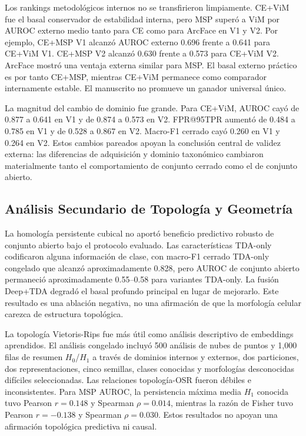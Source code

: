 \documentclass[11pt]{article}
\begin{document}
Los rankings metodológicos internos no se transfirieron limpiamente. CE+ViM fue el basal conservador de estabilidad interna, pero MSP superó a ViM por AUROC externo medio tanto para CE como para ArcFace en V1 y V2. Por ejemplo, CE+MSP V1 alcanzó AUROC externo 0.696 frente a 0.641 para CE+ViM V1. CE+MSP V2 alcanzó 0.630 frente a 0.573 para CE+ViM V2. ArcFace mostró una ventaja externa similar para MSP. El basal externo práctico es por tanto CE+MSP, mientras CE+ViM permanece como comparador internamente estable. El manuscrito no promueve un ganador universal único.

La magnitud del cambio de dominio fue grande. Para CE+ViM, AUROC cayó de 0.877 a 0.641 en V1 y de 0.874 a 0.573 en V2. FPR@95TPR aumentó de 0.484 a 0.785 en V1 y de 0.528 a 0.867 en V2. Macro-F1 cerrado cayó 0.260 en V1 y 0.264 en V2. Estos cambios pareados apoyan la conclusión central de validez externa: las diferencias de adquisición y dominio taxonómico cambiaron materialmente tanto el comportamiento de conjunto cerrado como el de conjunto abierto.

\subsection{Análisis Secundario de Topología y Geometría}

La homología persistente cubical no aportó beneficio predictivo robusto de conjunto abierto bajo el protocolo evaluado. Las características TDA-only codificaron alguna información de clase, con macro-F1 cerrado TDA-only congelado que alcanzó aproximadamente 0.828, pero AUROC de conjunto abierto permaneció aproximadamente 0.55--0.58 para variantes TDA-only. La fusión Deep+TDA degradó el basal profundo principal en lugar de mejorarlo. Este resultado es una ablación negativa, no una afirmación de que la morfología celular carezca de estructura topológica.

La topología Vietoris-Rips fue más útil como análisis descriptivo de embeddings aprendidos. El análisis congelado incluyó 500 análisis de nubes de puntos y 1,000 filas de resumen $H_0$/$H_1$ a través de dominios internos y externos, dos particiones, dos representaciones, cinco semillas, clases conocidas y morfologías desconocidas difíciles seleccionadas. Las relaciones topología-OSR fueron débiles e inconsistentes. Para MSP AUROC, la persistencia máxima media $H_1$ conocida tuvo Pearson $r=0.148$ y Spearman $\rho=0.014$, mientras la razón de Fisher tuvo Pearson $r=-0.138$ y Spearman $\rho=0.030$. Estos resultados no apoyan una afirmación topológica predictiva ni causal.
\end{document}
